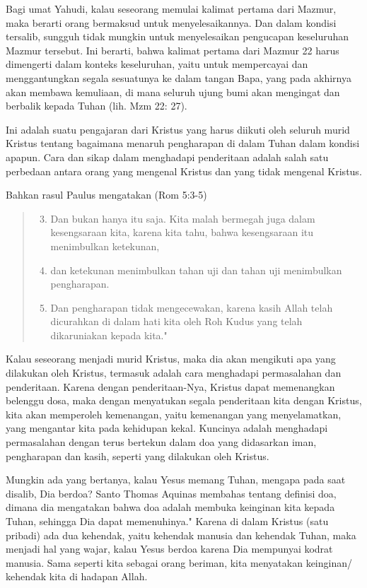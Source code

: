 Bagi umat Yahudi, kalau seseorang memulai kalimat pertama dari Mazmur, maka
berarti orang bermaksud untuk menyelesaikannya. Dan dalam kondisi tersalib,
sungguh tidak mungkin untuk menyelesaikan pengucapan keseluruhan Mazmur
tersebut. Ini berarti, bahwa kalimat pertama dari Mazmur 22 harus dimengerti
dalam konteks keseluruhan, yaitu untuk mempercayai dan menggantungkan segala
sesuatunya ke dalam tangan Bapa, yang pada akhirnya akan membawa kemuliaan, di
mana seluruh ujung bumi akan mengingat dan berbalik kepada Tuhan (lih. Mzm 22:
27). 

Ini adalah suatu pengajaran dari Kristus yang harus diikuti oleh seluruh
murid Kristus tentang bagaimana menaruh pengharapan di dalam Tuhan dalam
kondisi apapun. Cara dan sikap dalam menghadapi penderitaan adalah salah satu
perbedaan antara orang yang mengenal Kristus dan yang tidak mengenal Kristus.

Bahkan rasul Paulus mengatakan (Rom 5:3-5)
\begin{quote} 
\scriptsize
\begin{enumerate}
\setcounter{enumi}{2}

\item Dan bukan hanya itu saja. Kita malah bermegah
juga dalam kesengsaraan kita, karena kita tahu, bahwa kesengsaraan itu
menimbulkan ketekunan, \item  dan ketekunan menimbulkan tahan uji dan tahan uji
menimbulkan pengharapan. \item  Dan pengharapan tidak mengecewakan, karena kasih
Allah telah dicurahkan di dalam hati kita oleh Roh Kudus yang telah
dikaruniakan kepada kita." 
\end{enumerate}
\end{quote}

Kalau seseorang menjadi murid Kristus, maka dia akan mengikuti apa yang
dilakukan oleh Kristus, termasuk adalah cara menghadapi permasalahan dan
penderitaan. Karena dengan penderitaan-Nya, Kristus dapat memenangkan belenggu
dosa, maka dengan menyatukan segala penderitaan kita dengan Kristus, kita akan
memperoleh kemenangan, yaitu kemenangan yang menyelamatkan, yang mengantar kita
pada  kehidupan kekal. Kuncinya adalah menghadapi permasalahan dengan terus
bertekun dalam doa yang didasarkan iman, pengharapan dan kasih, seperti yang
dilakukan oleh Kristus.

Mungkin ada yang bertanya, kalau Yesus memang Tuhan, mengapa pada saat disalib,
Dia berdoa? Santo Thomas Aquinas
membahas tentang definisi doa, dimana dia mengatakan bahwa doa adalah membuka
keinginan kita kepada Tuhan, sehingga Dia dapat memenuhinya." Karena di
dalam Kristus (satu pribadi) ada dua kehendak, yaitu kehendak manusia dan
kehendak Tuhan, maka menjadi hal yang wajar, kalau Yesus berdoa karena Dia
mempunyai kodrat manusia. Sama seperti kita sebagai orang beriman, kita
menyatakan keinginan/ kehendak kita di hadapan Allah.

